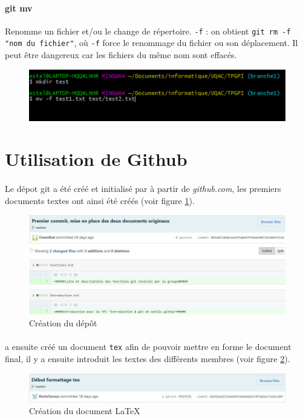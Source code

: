 \documentclass[11pt,canadien]{article}
\begin{document}
\paragraph{git mv}Renomme un fichier et/ou le change de répertoire. \texttt{-f} : on obtient \texttt{git rm -f "nom du fichier"}, où \texttt{-f} force le renommage du fichier ou son déplacement. Il peut être dangereux car les fichiers du même nom sont effacés.
\begin{figure}[H]
	\centering
	\includegraphics{images/git_mv_-f}
\end{figure}


\section{Utilisation de Github}

\paragraph{}Le dépot git a été créé et initialisé par \joffrey à partir de \textit{github.com}, les premiers documents textes ont ainsi été créés (voir figure \ref{fig:InitDepot}).

\begin{figure}[h]
	\centering
	\includegraphics[width=\textwidth]{images/initialisation_depot.JPG}
	\caption{Création du dépôt}
	\label{fig:InitDepot}
\end{figure}
\paragraph{}\kevin a ensuite créé un document \texttt{tex} afin de pouvoir mettre en forme le document final, il y a ensuite introduit les textes des différents membres (voir figure \ref{fig:InitLatex}).
\begin{figure}[h]
	\centering
	\includegraphics[width=\textwidth]{images/initialisation_tex.JPG}
	\caption{Création du document \LaTeX}
	\label{fig:InitLatex}
\end{figure}
\end{document}
